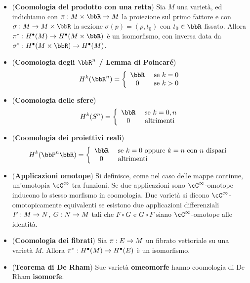 \documentclass[a4paper,NoNotes,GeneralMath]{stdmdoc}
\newcommand{\xrar}[1]{\ensuremath{\xrightarrow{#1}}}
\begin{document}
\begin{itemize}
  Essa induce quindi una successione esatta lunga in coomologia: dato quindi $\{U_0, U_1\}$ {\emph ricoprimento aperto} di $M$, si ha la successione esatta.
  $$ \ldots \rar H^k(M) \rar H^k(U_0) \oplus H^k(U_1) \rar H^k(U_0 \cap U_1) \xrar{d^*} H^{k+1}(M) \rar \ldots $$
\item ({\bf Coomologia del prodotto con una retta}) Sia $M$ una varietà, ed indichiamo con $\pi: M \times \bbR \rar M$ la proiezione sul primo fattore e con $\sigma: M \rar M \times \bbR$ la sezione $\sigma(p) = (p, t_0)$ con $t_0 \in \bbR$ fissato. Allora $\pi^*: H^\bullet(M) \rar H^\bullet(M \times \bbR)$ è un isomorfismo, con inversa data da $\sigma^*: H^\bullet(M \times \bbR) \rar H^\bullet(M)$.
\item ({\bf Coomologia degli $\bbR^n$ / Lemma di Poincaré})
  \begin{displaymath}
    H^k(\bbR^n) =
    \left\{
      \begin{array}{cl}
        \bbR & \text{ se } k = 0 \\
        0    & \text{ se } k > 0 \\
      \end{array}
    \right.
  \end{displaymath}
\item ({\bf Coomologia delle sfere})
  \begin{displaymath}
    H^k(S^n) =
    \left\{
      \begin{array}{cl}
      \bbR & \text{ se } k = 0, n \\
      0    & \text{ altrimenti }  \\
      \end{array}
    \right.
  \end{displaymath}
\item ({\bf Coomologia dei proiettivi reali})
  \begin{displaymath}
    H^k(\bbP^n\bbR) =
    \left\{
      \begin{array}{cl}
        \bbR & \text{ se } k = 0 \text{ oppure } k = n \text{ con } n \text{ dispari } \\
        0    & \text{ altrimenti }                                                     \\
      \end{array}
    \right.
  \end{displaymath}
\item ({\bf Applicazioni omotope}) Si definisce, come nel caso delle mappe continue, un'omotopia $\cC^\infty$ tra funzioni. Se due applicazioni sono $\cC^\infty$-omotope inducono lo stesso morfismo in coomologia. Due varietà si dicono $\cC^\infty$-omotopicamente equivalenti se esistono due applicazioni differenziali $F: M \rightarrow N$, $G: N \rightarrow M$ tali che $F \circ G$ e $G \circ F$ siano $\cC^\infty$-omotope alle identità.
\item ({\bf Coomologia dei fibrati}) Sia $\pi: E \rightarrow M$ un fibrato vettoriale su una varietà $M$. Allora $\pi^*: H^\bullet(M) \rightarrow H^\bullet(E)$ è un isomorfismo.
\item ({\bf Teorema di De Rham}) Sue varietà {\bf omeomorfe} hanno coomologia di De Rham {\bf isomorfe}.
\end{itemize}
\end{document}
